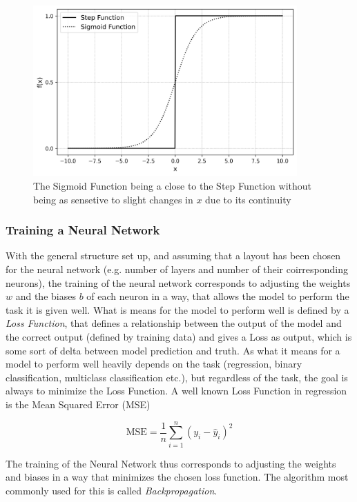 \begin{figure}[h] 
	\centering
	\includegraphics[width=0.9\textwidth]{figures/modelling/activation_functions.png} %
	\caption{The Sigmoid Function being a close to the Step Function without being as sensetive to slight changes in $x$ due to its continuity}
	\label{fig:activation_functions}
\end{figure}

\cite{nielsen2015neuralChap1}


\subsubsection{Training a Neural Network}

With the general structure set up, and assuming that a layout has been chosen for the neural network (e.g. number of layers and number of their coirresponding neurons), the training of the neural network corresponds to adjusting the weights $w$ and the biases $b$ of each neuron in a way, that allows the model to perform the task it is given well. What is means for the model to perform well is defined by a \textit{Loss Function}, that defines a relationship between the output of the model and the correct output (defined by training data) and gives a Loss as output, which is some sort of delta between model prediction and truth. As what it means for a model to perform well heavily depends on the task (regression, binary classification, multiclass classification etc.), but regardless of the task, the goal is always to minimize the Loss Function. A well known Loss Function in regression is the Mean Squared Error (MSE)

\[
\text{MSE} = \frac{1}{n} \sum_{i=1}^{n} (y_i - \hat{y}_i)^2
\]

The training of the Neural Network thus corresponds to adjusting the weights and biases in a way that minimizes the chosen loss function. The algorithm most commonly used for this is called \textit{Backpropagation}.
 \cite{nielsen2015neuralChap1}
 
